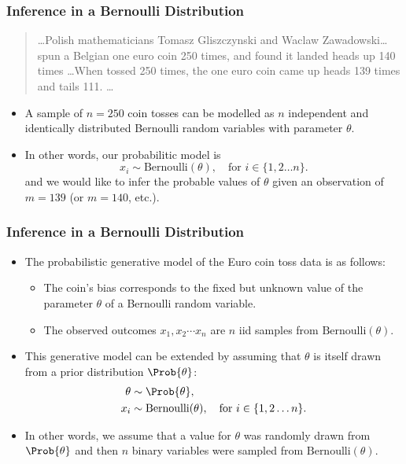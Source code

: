 \documentclass{slides}
\begin{document}
\begin{frame}
\frametitle{Inference in a Bernoulli Distribution}

\begin{quotation} \ldots Polish mathematicians Tomasz Gliszczynski and
	Waclaw Zawadowski\ldots spun a Belgian one euro coin 250 times,
	and found it landed heads up 140 times \ldots When tossed 250
	times, the one euro coin came up heads 139 times and tails 111.
	\ldots 
\end{quotation}


	\begin{itemize}
		\item A sample of $n=250$ coin tosses can be modelled as $n$ independent and identically distributed Bernoulli random variables with parameter $\theta$.
		\item In other words, our probabilitic model is
			\[
				x_i \sim \textrm{Bernoulli}(\theta),\quad\text{for $i \in \{1,2\ldots n\}$.}
			\]
			and we would like to infer the probable values of $\theta$ given an observation of $m=139$ (or $m=140$, etc.).
	\end{itemize}
\end{frame}
\begin{frame}
	\frametitle{Inference in a Bernoulli Distribution}
	\begin{itemize}
		\item The probabilistic generative model of the Euro coin toss data is as follows:
			\begin{itemize}
				\item The coin's bias corresponds to the fixed but unknown value of the parameter $\theta$ of a Bernoulli random variable.
				\item The observed outcomes $x_1, x_2 \cdots x_n$ are $n$ iid samples from $\textrm{Bernoulli}(\theta)$.
			\end{itemize}
		\item This generative model can be extended by assuming that $\theta$ is itself drawn from a prior distribution $\Prob{\theta}$:
			\begin{align*}
				\theta &\sim \Prob{\theta},\\
				x_i &\sim \textrm{Bernoulli}(\theta),\quad\text{for $i \in \{1,2\ldots n\}$.}
			\end{align*}
		\item In other words, we assume that a value for $\theta$ was randomly drawn from $\Prob{\theta}$ and then $n$ binary variables were sampled from $\textrm{Bernoulli}(\theta)$.
	\end{itemize}
\end{frame}
\end{document}
